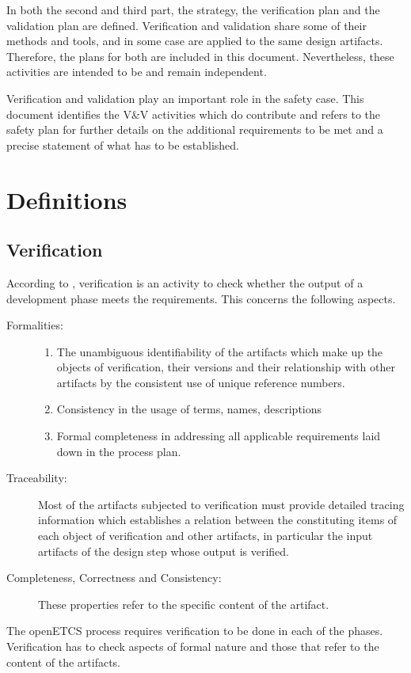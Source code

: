 \documentclass{template/openetcs_report}
\begin{document}
In both the second and third part, the \vv strategy, the verification
plan and the validation plan are defined. Verification and validation
share some of their methods and tools, and in some case are applied to
the same design artifacts. Therefore, the plans for both are included
in this document. Nevertheless, these activities are intended to be
and remain independent.

Verification and validation play an important role in the safety
case. This document identifies the V\&V activities which do contribute
and refers to the safety plan for further details on the additional
requirements to be met and a precise statement of what has to be
established.

\chapter{Definitions}
\label{sec:definitions}


\section{Verification}
\label{sec:definition-verification}

According to \cite[3.1.48]{EN50128:2011}, verification is an activity
to check whether the output of a development phase meets the
requirements. This concerns the following aspects.
%
\begin{description}
\item[Formalities:] \cite[5.3.2.7 to 10]{EN50128:2011}
  \begin{enumerate}
  \item The unambiguous identifiability of the artifacts which make up
    the objects of verification, their versions and their relationship
    with other artifacts by the consistent use of unique reference numbers.
\item Consistency in the usage of terms, names, descriptions
\item Formal completeness in addressing all applicable 
  requirements laid down in the process plan.  
  \end{enumerate}
\item[Traceability:] \cite[6.5.4.14 to 17]{EN50128:2011} Most of the
  artifacts subjected to verification must provide detailed tracing information which
  establishes a relation between the constituting items of each object
  of verification and other artifacts, in particular the input
  artifacts of the design step whose output is verified. 
\item[Completeness, Correctness and Consistency:] These properties
  refer to the specific content of the artifact.
\end{description}
%
 The openETCS process \cite{openETCS:D2.3a-V02} requires
verification to be done in each of the phases. Verification has to check aspects of
formal nature and those that refer to the content of the artifacts.
\end{document}
